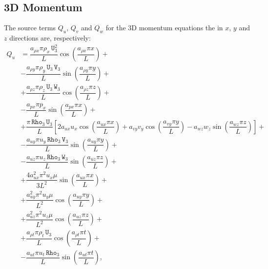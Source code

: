 \documentclass[10pt]{article}
\newcommand{\Rho}{\,\mathtt{Rho}}
\newcommand{\U}{\,\mathtt{U}}
\newcommand{\V}{\,\mathtt{V}}
\newcommand{\W}{\,\mathtt{W}}
\begin{document}
\subsection{3D Momentum}

The source terms $Q_{u}$, $Q_{v}$ and $Q_{w}$ for the 3D momentum equations the in $x$, $y$ and $z$ directions are, respectively:
%
\begin{equation}
 \begin{split}
Q_u &= \dfrac{a_{\rho x} \pi \rho_x \U_3^2 }{L}\cos\left(\dfrac{a_{\rho x} \pi x}{L}\right)+\\
&-\dfrac{a_{\rho y} \pi \rho_y \U_3 \V_3 }{L}\sin\left(\dfrac{a_{\rho y} \pi y}{L}\right)+\\
&+\dfrac{a_{\rho z} \pi \rho_z \U_3 \W_3 }{L}\cos\left(\dfrac{a_{\rho z}\pi z }{L}\right)+\\
&-\dfrac{a_{px} \pi p_x }{L}\sin\left(\dfrac{a_{px} \pi x}{L}\right)+\\
&+\dfrac{\pi \Rho_3 \U_3}{L}\left[2 a_{ux} u_x \cos\left(\dfrac{a_{ux} \pi x}{L}\right)+a_{vy} v_y \cos\left(\dfrac{a_{vy} \pi y}{L}\right)-a_{wz} w_z \sin\left(\dfrac{a_{wz}\pi z }{L}\right)\right]+\\
&-\dfrac{a_{uy} \pi u_y \Rho_3 \V_3}{L} \sin\left(\dfrac{a_{uy} \pi y}{L}\right)+\\
&-\dfrac{a_{uz} \pi u_z \Rho_3 \W_3 }{L}\sin\left(\dfrac{a_{uz}\pi z }{L}\right)+\\
&+ \dfrac{4 a_{ux}^2 \pi^2  u_x \mu}{3L^2}\sin\left(\dfrac{ a_{ux}\pi x}{L}\right) +\\
&+ \dfrac{a_{uy}^2 \pi^2 u_y \mu}{L^2}\cos\left(\dfrac{a_{uy} \pi y}{L}\right) +\\
&+ \dfrac{a_{uz}^2 \pi^2 u_z \mu}{L^2}\cos\left(\dfrac{a_{uz} \pi z}{L}\right)+\\
&+ \dfrac{ a_{\rho t} \pi \rho_t \U_3}{L}\cos\left(\dfrac{a_{\rho t} \pi t}{L}\right)+\\
&-\dfrac{a_{ut} \pi u_t  \Rho_3 }{L}\sin\left(\dfrac{a_{ut} \pi t}{L}\right)
,
 \end{split}
\end{equation}
\end{document}
